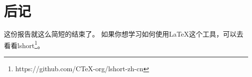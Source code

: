 \chapter{后记}
这份报告就这么简短的结束了。
如果你想学习如何使用\LaTeX{}这个工具，可以去看看lshort\footnote{https://github.com/CTeX-org/lshort-zh-cn}。